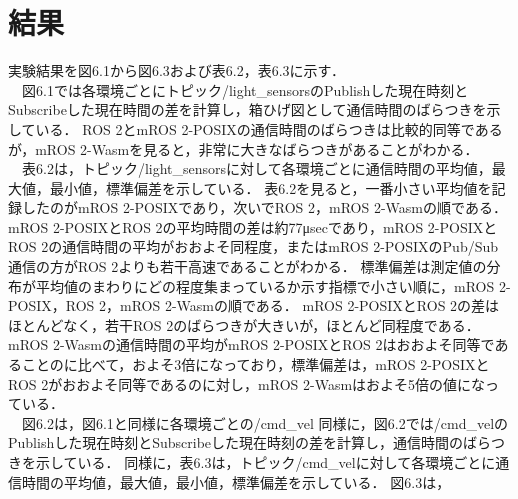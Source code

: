 \section{結果}
実験結果を図6.1から図6.3および表6.2，表6.3に示す．
\\　図6.1では各環境ごとにトピック/light\_sensorsのPublishした現在時刻とSubscribeした現在時間の差を計算し，箱ひげ図として通信時間のばらつきを示している．
ROS 2とmROS 2-POSIXの通信時間のばらつきは比較的同等であるが，mROS 2-Wasmを見ると，非常に大きなばらつきがあることがわかる．
\\　表6.2は，トピック/light\_sensorsに対して各環境ごとに通信時間の平均値，最大値，最小値，標準偏差を示している．
表6.2を見ると，一番小さい平均値を記録したのがmROS 2-POSIXであり，次いでROS 2，mROS 2-Wasmの順である．
mROS 2-POSIXとROS 2の平均時間の差は約77μsecであり，mROS 2-POSIXとROS 2の通信時間の平均がおおよそ同程度，またはmROS 2-POSIXのPub/Sub通信の方がROS 2よりも若干高速であることがわかる．
標準偏差は測定値の分布が平均値のまわりにどの程度集まっているか示す指標で小さい順に，mROS 2-POSIX，ROS 2，mROS 2-Wasmの順である．
mROS 2-POSIXとROS 2の差はほとんどなく，若干ROS 2のばらつきが大きいが，ほとんど同程度である．
mROS 2-Wasmの通信時間の平均がmROS 2-POSIXとROS 2はおおよそ同等であることのに比べて，およそ3倍になっており，標準偏差は，mROS 2-POSIXとROS 2がおおよそ同等であるのに対し，mROS 2-Wasmはおよそ5倍の値になっている．
\\　図6.2は，図6.1と同様に各環境ごとの/cmd\_vel
同様に，図6.2では/cmd\_velのPublishした現在時刻とSubscribeした現在時刻の差を計算し，通信時間のばらつきを示している．
同様に，表6.3は，トピック/cmd\_velに対して各環境ごとに通信時間の平均値，最大値，最小値，標準偏差を示している．
図6.3は，


